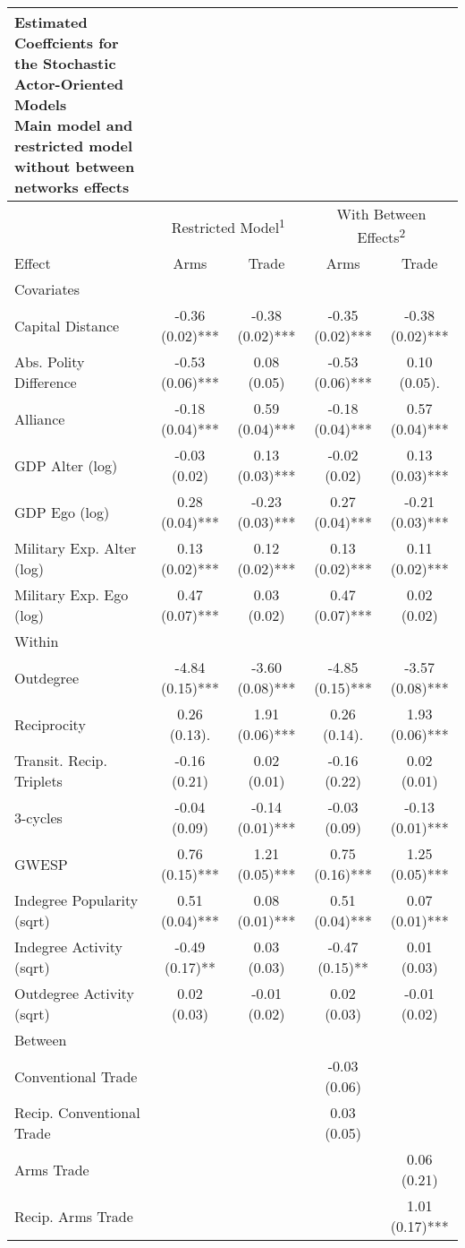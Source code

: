 \captionsetup[table]{labelformat=empty,skip=1pt}
\begin{longtable}{lcccc}
\caption*{
{\large Estimated Coeffcients for the Stochastic Actor-Oriented Models} \\ 
{\small Main model and restricted model without between networks effects}
} \\ 
\toprule
 & \multicolumn{2}{c}{Restricted Model\textsuperscript{1}} & \multicolumn{2}{c}{With Between Effects\textsuperscript{2}} \\ 
 \cmidrule(lr){2-3} \cmidrule(lr){4-5}
Effect & Arms & Trade & Arms & Trade \\ 
\midrule
\multicolumn{1}{l}{Covariates} \\ 
\midrule
Capital Distance & -0.36 (0.02)*** & -0.38 (0.02)*** & -0.35 (0.02)*** & -0.38 (0.02)*** \\ 
Abs. Polity Difference & -0.53 (0.06)*** &  0.08 (0.05)    & -0.53 (0.06)*** &  0.10 (0.05).   \\ 
Alliance & -0.18 (0.04)*** &  0.59 (0.04)*** & -0.18 (0.04)*** &  0.57 (0.04)*** \\ 
GDP Alter (log) & -0.03 (0.02)    &  0.13 (0.03)*** & -0.02 (0.02)    &  0.13 (0.03)*** \\ 
GDP Ego (log) &  0.28 (0.04)*** & -0.23 (0.03)*** &  0.27 (0.04)*** & -0.21 (0.03)*** \\ 
Military Exp. Alter (log) &  0.13 (0.02)*** &  0.12 (0.02)*** &  0.13 (0.02)*** &  0.11 (0.02)*** \\ 
Military Exp. Ego (log) &  0.47 (0.07)*** &  0.03 (0.02)    &  0.47 (0.07)*** &  0.02 (0.02)    \\ 
\midrule
\multicolumn{1}{l}{Within} \\ 
\midrule
Outdegree & -4.84 (0.15)*** & -3.60 (0.08)*** & -4.85 (0.15)*** & -3.57 (0.08)*** \\ 
Reciprocity &  0.26 (0.13).   &  1.91 (0.06)*** &  0.26 (0.14).   &  1.93 (0.06)*** \\ 
Transit. Recip. Triplets & -0.16 (0.21)    &  0.02 (0.01)    & -0.16 (0.22)    &  0.02 (0.01)    \\ 
3-cycles & -0.04 (0.09)    & -0.14 (0.01)*** & -0.03 (0.09)    & -0.13 (0.01)*** \\ 
GWESP &  0.76 (0.15)*** &  1.21 (0.05)*** &  0.75 (0.16)*** &  1.25 (0.05)*** \\ 
Indegree Popularity (sqrt) &  0.51 (0.04)*** &  0.08 (0.01)*** &  0.51 (0.04)*** &  0.07 (0.01)*** \\ 
Indegree Activity (sqrt) & -0.49 (0.17)**  &  0.03 (0.03)    & -0.47 (0.15)**  &  0.01 (0.03)    \\ 
Outdegree Activity (sqrt) &  0.02 (0.03)    & -0.01 (0.02)    &  0.02 (0.03)    & -0.01 (0.02)    \\ 
\midrule
\multicolumn{1}{l}{Between} \\ 
\midrule
Conventional Trade &  &  & -0.03 (0.06)    &  \\ 
Recip. Conventional Trade &  &  &  0.03 (0.05)    &  \\ 
Arms Trade &  &  &  &  0.06 (0.21)    \\ 
Recip. Arms Trade &  &  &  &  1.01 (0.17)*** \\ 
 \bottomrule
\end{longtable}
